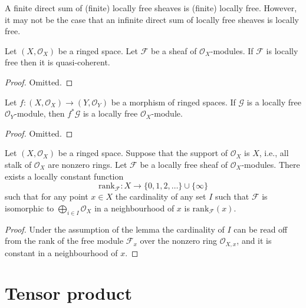 \noindent
A finite direct sum of (finite) locally free sheaves is (finite)
locally free. However, it may not be the case that an infinite direct
sum of locally free sheaves is locally free.

\begin{lemma}
\label{lemma-locally-free-quasi-coherent}
Let $(X, \mathcal{O}_X)$ be a ringed space.
Let $\mathcal{F}$ be a sheaf of $\mathcal{O}_X$-modules.
If $\mathcal{F}$ is locally free then it is quasi-coherent.
\end{lemma}

\begin{proof}
Omitted.
\end{proof}

\begin{lemma}
\label{lemma-pullback-locally-free}
Let $f : (X, \mathcal{O}_X) \to (Y, \mathcal{O}_Y)$
be a morphism of ringed spaces. If $\mathcal{G}$ is
a locally free $\mathcal{O}_Y$-module, then
$f^*\mathcal{G}$ is a locally free $\mathcal{O}_X$-module.
\end{lemma}

\begin{proof}
Omitted.
\end{proof}

\begin{lemma}
\label{lemma-rank}
Let $(X, \mathcal{O}_X)$ be a ringed space.
Suppose that the support of $\mathcal{O}_X$ is $X$,
i.e., all stalk of $\mathcal{O}_X$ are nonzero rings.
Let $\mathcal{F}$ be a locally free sheaf of $\mathcal{O}_X$-modules.
There exists a locally constant function
$$
\text{rank}_{\mathcal{F}} :
X \longrightarrow \{0, 1, 2, \ldots\}\cup\{\infty\}
$$
such that for any point $x \in X$ the cardinality of any
set $I$ such that $\mathcal{F}$ is isomorphic to
$\bigoplus_{i\in I} \mathcal{O}_X$ in a neighbourhood
of $x$ is $\text{rank}_{\mathcal{F}}(x)$.
\end{lemma}

\begin{proof}
Under the assumption of the lemma the cardinality of $I$ can be read off
from the rank of the free module $\mathcal{F}_x$ over the nonzero ring
$\mathcal{O}_{X, x}$, and it is constant in a neighbourhood of $x$.
\end{proof}






\section{Tensor product}
\label{section-tensor-product}


